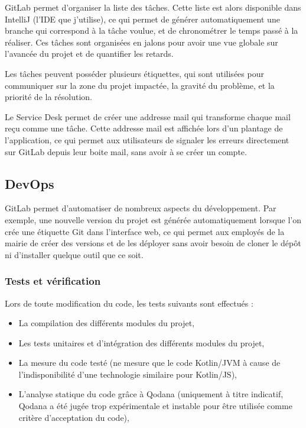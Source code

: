 GitLab permet d'organiser la liste des tâches.
Cette liste est alors disponible dans IntelliJ (l'IDE que j'utilise), ce qui permet de générer automatiquement une branche qui correspond à la tâche voulue, et de chronométrer le temps passé à la réaliser.
Ces tâches sont organisées en jalons pour avoir une vue globale sur l'avancée du projet et de quantifier les retards.

Les tâches peuvent posséder plusieurs étiquettes, qui sont utilisées pour communiquer sur la zone du projet impactée, la gravité du problème, et la priorité de la résolution.

Le Service Desk permet de créer une addresse mail qui transforme chaque mail reçu comme une tâche.
Cette addresse mail est affichée lors d'un plantage de l'application, ce qui permet aux utilisateurs de signaler les erreurs directement sur GitLab depuis leur boite mail, sans avoir à se créer un compte.

\subsection{DevOps}\label{subsec:devops}

GitLab permet d'automatiser de nombreux aspects du développement.
Par exemple, une nouvelle version du projet est générée automatiquement lorsque l'on crée une étiquette Git dans l'interface web, ce qui permet aux employés de la mairie de créer des versions et de les déployer sans avoir besoin de cloner le dépôt ni d'installer quelque outil que ce soit.

\subsubsection{Tests et vérification}

Lors de toute modification du code, les tests suivants sont effectués :
\begin{itemize}
	\item La compilation des différents modules du projet,
	\item Les tests unitaires et d'intégration des différents modules du projet,
	\item La mesure du code testé (ne mesure que le code Kotlin/JVM à cause de l'indisponibilité d'une technologie similaire pour Kotlin/JS),
	\item L'analyse statique du code grâce à Qodana (uniquement à titre indicatif, Qodana a été jugée trop expérimentale et instable pour être utilisée comme critère d'acceptation du code),
\end{itemize}

